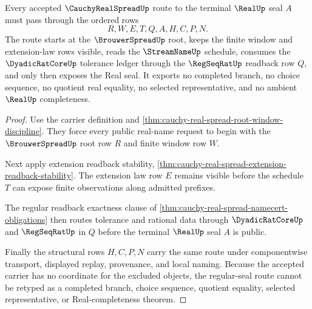 \begin{theorem}
\label{thm:cauchy-real-spread-regular-seal-route}
Every accepted $\CauchyRealSpreadUp$ route to the terminal $\RealUp$ seal $A$ must pass through the ordered rows
$$
R,W,E,T,Q,A,H,C,P,N.
$$
The route starts at the $\BrouwerSpreadUp$ root, keeps the finite window and extension-law rows visible, reads the $\StreamNameUp$ schedule, consumes the $\DyadicRatCoreUp$ tolerance ledger through the $\RegSeqRatUp$ readback row $Q$, and only then exposes the Real seal. It exports no completed branch, no choice sequence, no quotient real equality, no selected representative, and no ambient $\RealUp$ completeness.
\end{theorem}
\begin{proof}
Use the carrier definition and \autoref{thm:cauchy-real-spread-root-window-discipline}. They force every public real-name request to begin with the $\BrouwerSpreadUp$ root row $R$ and finite window row $W$.

Next apply extension readback stability, \autoref{thm:cauchy-real-spread-extension-readback-stability}. The extension law row $E$ remains visible before the schedule $T$ can expose finite observations along admitted prefixes.

The regular readback exactness clause of \autoref{thm:cauchy-real-spread-namecert-obligations} then routes tolerance and rational data through $\DyadicRatCoreUp$ and $\RegSeqRatUp$ in $Q$ before the terminal $\RealUp$ seal $A$ is public.

Finally the structural rows $H,C,P,N$ carry the same route under componentwise transport, displayed replay, provenance, and local naming. Because the accepted carrier has no coordinate for the excluded objects, the regular-seal route cannot be retyped as a completed branch, choice sequence, quotient equality, selected representative, or Real-completeness theorem.
\end{proof}

